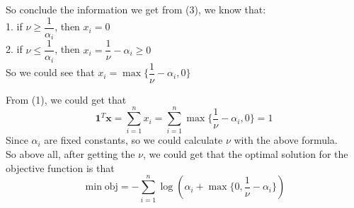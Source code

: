 So conclude the information we get from (3), we know that:\\
1. if $\nu\geq\dfrac{1}{\alpha_i}$, then $x_i=0$\\
2. if $\nu\leq\dfrac{1}{\alpha_i}$, then $x_i=\dfrac{1}{\nu}-\alpha_i\geq 0$\\
So we could see that $x_i=\max\{\dfrac{1}{\nu}-\alpha_i,0\}$

From (1), we could get that
$$\mathbf{1}^T\mathbf{x}=\sum_{i=1}^nx_i=\sum_{i=1}^n\max\{\dfrac{1}{\nu}-\alpha_i,0\}=1$$
Since $\alpha_i$ are fixed constants, so we could calculate $\nu$ with the above formula.\\

So above all, after getting the $\nu$, we could get that the optimal solution for the objective function is that
$$\min \text{obj} = -\sum_{i=1}^n\log \left(\alpha_i+\max\{ 0, \dfrac{1}{\nu}-\alpha_i \} \right)$$